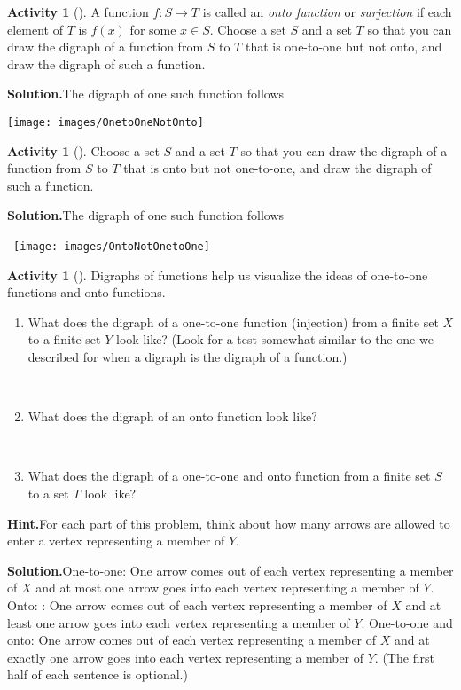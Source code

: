 \documentclass[10pt,]{book}
\theoremstyle{plain}
\theoremstyle{definition}
\newtheorem{activity}[project]{Activity}
\numberwithin{equation}{chapter}
\begin{document}
\begin{activity}[]\label{activity-24}
A function \(f:S\rightarrow T\) is called an \emph{onto function} or \emph{surjection} if each element of \(T\) is \(f(x)\) for some \(x\in S\). Choose a set \(S\) and a set \(T\) so that you can draw the digraph of a function from \(S\) to \(T\) that is one-to-one but not onto, and draw the digraph of such a function.%
\par\medskip\noindent%
\textbf{Solution.}\quad The digraph of one such function follows%
\par
\texttt{[image: images/OnetoOneNotOnto]}
%
\end{activity}
\begin{activity}[]\label{activity-25}
Choose a set \(S\) and a set \(T\) so that you can draw the digraph of a function from \(S\) to \(T\) that is onto but not one-to-one, and draw the digraph of such a function.%
\par\medskip\noindent%
\textbf{Solution.}\quad The digraph of one such function follows%
\par
\mbox{ \texttt{[image: images/OntoNotOnetoOne]}
 }%
\end{activity}
\begin{activity}[]\label{activity-26}
Digraphs of functions help us visualize the ideas of one-to-one functions and onto functions.%
~\par
\begin{enumerate}[label=(\alph*)]
 \item What does the digraph of a one-to-one function (injection) from a finite set \(X\) to a finite set \(Y\) look like? (Look for a test somewhat similar to the one we described for when a digraph is the digraph of a function.)%

~\par
\item What does the digraph of an onto function look like?%

~\par
\item What does the digraph of a one-to-one and onto function from a finite set \(S\) to a set \(T\) look like?%

\end{enumerate}
\par\medskip\noindent%
\textbf{Hint.}\quad For each part of this problem, think about how many arrows are allowed to enter a vertex representing a member of \(Y\).\par\medskip\noindent%
\textbf{Solution.}\quad One-to-one: One arrow comes out of each vertex representing a member of \(X\) and at most one arrow goes into each vertex representing a member of \(Y\). Onto: : One arrow comes out of each vertex representing a member of \(X\) and at least one arrow goes into each vertex representing a member of \(Y\). One-to-one and onto: One arrow comes out of each vertex representing a member of \(X\) and at exactly one arrow goes into each vertex representing a member of \(Y\). (The first half of each sentence is optional.)%
\end{activity}
\end{document}
